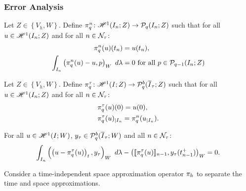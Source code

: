 \subsubsection{Error Analysis}

\begin{definition}[$\InterpolantQN$]
    Let $Z \in \left\{V_h, W\right\}$. Define $\pi^n_q \colon \mathscr{H}^{1}(I_n; Z) \rightarrow \mathcal{P}_{q}(I_n; Z)$ such that for all $u \in \mathscr{H}^{1}(I_n; Z)$ and for all $n \in \mathcal{N}_{\tau}$:
    \begin{align}
        \pi^n_q(u)(t_n) & = u(t_n), \\
        \int_{I_n} \left( \pi^n_q(u) - u, p \right)_W ~ d \lambda & = 0 \text{ for all } p \in \mathcal{P}_{q - 1}(I_n; Z)
    \end{align}
\end{definition}

\begin{definition}[$\InterpolantQT$]
    Let $Z \in \left\{V_h, W\right\}$. Define $\pi^{\tau}_q \colon \mathscr{H}^{1}(I; Z) \rightarrow \mathcal{P}_{q}^b(\overline{I}_{\tau}; Z)$ such that for all $u \in \mathscr{H}^{1}(I_n; Z)$ and for all $n \in \mathcal{N}_{\tau}$:
    \begin{align}
        & \pi^{\tau}_q(u)(0) = u(0), \\
        & \pi^{\tau}_q(u)_{\mid I_n} = \pi^n_q(u_{\mid I_n}).
    \end{align}
\end{definition}

\begin{lemma}[Orthogonality]
    For all $u \in \mathscr{H}^{1}(I; W)$, $y_{\tau} \in \mathcal{P}_{q}^b(\overline{I}_{\tau}; W)$ and all $n \in \mathcal{N}_{\tau}$:
    \begin{gather}
        \int_{I_n} \left( \left( u - \pi^{\tau}_q(u) \right)_t, y_{\tau} \right)_W ~ d \lambda - \left( \llbracket \pi^{\tau}_q(u) \rrbracket_{n - 1}, y_{\tau}(t_{n - 1}^+) \right)_W = 0.
    \end{gather}
\end{lemma}

Consider a time-independent space approximation operator $\pi_h$ to separate the time and space approximations.


